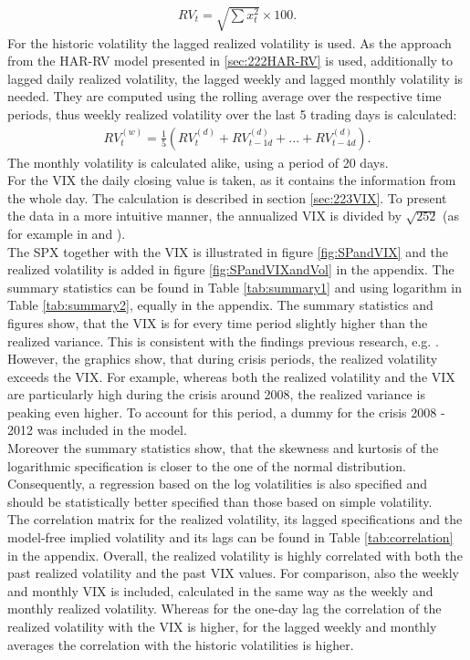 \begin{align}
RV_{t} = \sqrt{\sum x_{t}^{2}} \times 100.
\end{align}
For the historic volatility the lagged realized volatility is used. As the approach from the HAR-RV model presented in \ref{sec:222HAR-RV} is used, additionally to lagged daily realized volatility, the lagged weekly and lagged monthly volatility is needed. They are computed using the rolling average over the respective time periods, thus weekly realized volatility over the last 5 trading days is calculated:
\begin{align}
RV_{t}^{(w)} = \frac{1}{5} (RV_{t}^{(d)} + RV_{t-1d}^{(d)} + ... + RV_{t-4d}^{(d)}).
\end{align}
The monthly volatility is calculated alike, using a period of 20 days.\\
For the \ac{VIX} the daily closing value is taken, as it contains the information from the whole day. The calculation is described in section \ref{sec:223VIX}. To present the data in a more intuitive manner, the annualized \ac{VIX} is divided by $\sqrt{252}$ (as for example in \textcite{blair2001} and \textcite{whaley2008}).\\
The \ac{SPX} together with the \ac{VIX} is illustrated in figure \ref{fig:SPandVIX} and the realized volatility is added in figure \ref{fig:SPandVIXandVol} in the appendix. The summary statistics can be found in Table \ref{tab:summary1} and using logarithm in Table \ref{tab:summary2}, equally in the appendix. The summary statistics and figures show, that the \ac{VIX} is for every time period slightly higher than the realized variance. This is consistent with the findings previous research, e.g. \textcite{jiang2003}. However, the graphics show, that during crisis periods, the realized volatility exceeds the \ac{VIX}. For example, whereas both the realized volatility and the \ac{VIX} are particularly high during the crisis around 2008, the realized variance is peaking even higher. To account for this period, a dummy for the crisis 2008 - 2012 was included in the model.\\
Moreover the summary statistics show, that the skewness and kurtosis of the logarithmic specification is closer to the one of the normal distribution. Consequently, a regression based on the log volatilities is also specified and should be statistically better specified than those based on simple volatility.\\
The correlation matrix for the realized volatility, its lagged specifications and the model-free implied volatility and its lags can be found in Table \ref{tab:correlation} in the appendix. Overall, the realized volatility is highly correlated with both the past realized volatility and the past \ac{VIX} values. For comparison, also the weekly and monthly \ac{VIX} is included, calculated in the same way as the weekly and monthly realized volatility. Whereas for the one-day lag the correlation of the realized volatility with the \ac{VIX} is higher, for the lagged weekly and monthly averages the correlation with the historic volatilities is higher. 


